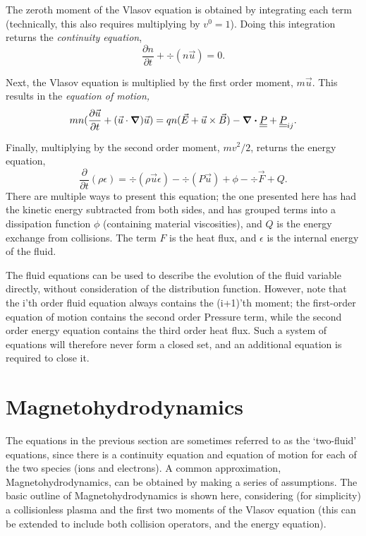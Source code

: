 The zeroth moment of the Vlasov equation is obtained by integrating each term (technically, this also requires multiplying by $v^0 = 1$). Doing this integration returns the \textit{continuity equation},
\begin{equation} \frac{\partial n}{\partial t} + \div (n \vec{u}) = 0. \end{equation}

Next, the Vlasov equation is multiplied by the first order moment, $m\vec{u}$. This results in the \textit{equation of motion,}
\begin{equation} mn(\frac{\partial \vec{u}}{\partial t} + (\vec{u} \cdot \grad)\vec{u}) = qn(\vec{E} + \vec{u} \times \vec{B}) - \div \underline{\underline{P}} + \underline{\underline{P}}_{ij} .\end{equation}

Finally, multiplying by the second order moment, $mv^2 / 2$, returns the energy equation,
\begin{equation} \frac{ \partial}{\partial t} (\rho \epsilon) = \div (\rho \vec{u} \epsilon) - \div (P \vec{u}) + \phi - \div \vec{F} + Q. \end{equation}
There are multiple ways to present this equation; the one presented here has had the kinetic energy subtracted from both sides, and has grouped terms into a dissipation function $\phi$ (containing material viscosities), and $Q$ is the energy exchange from collisions. The term $F$ is the heat flux, and $\epsilon$ is the internal energy of the fluid.

The fluid equations can be used to describe the evolution of the fluid variable directly, without consideration of the distribution function. However, note that the i'th order fluid equation always contains the (i+1)'th moment; the first-order equation of motion contains the second order Pressure term, while the second order energy equation contains the third order heat flux. Such a system of equations will therefore never form a closed set, and an additional equation is required to close it.

\section{Magnetohydrodynamics}
The equations in the previous section are sometimes referred to as the `two-fluid' equations, since there is a continuity equation and equation of motion for each of the two species (ions and electrons). A common approximation, Magnetohydrodynamics, can be obtained by making a series of assumptions. The basic outline of Magnetohydrodynamics is shown here, considering (for simplicity) a collisionless plasma and the first two moments of the Vlasov equation (this can be extended to include both collision operators, and the energy equation).

